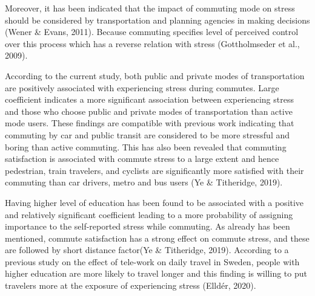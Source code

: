\documentclass[
11pt, %
oneside, %
english, %
singlespacing, %
]{macthesis} %
\begin{document}
Moreover, it has been indicated that the impact of commuting mode on stress should be considered by transportation and planning agencies in making decisions (Wener \& Evans, 2011). Because commuting specifies level of perceived control over this process which has a reverse relation with stress (Gottholmseder et al., 2009).

According to the current study, both public and private modes of transportation are positively associated with experiencing stress during commutes. Large coefficient indicates a more significant association between experiencing stress and those who choose public and private modes of transportation than active mode users. These findings are compatible with previous work indicating that commuting by car and public transit are considered to be more stressful and boring than active commuting. This has also been revealed that commuting satisfaction is associated with commute stress to a large extent and hence pedestrian, train travelers, and cyclists are significantly more satisfied with their commuting than car drivers, metro and bus users (Ye \& Titheridge, 2019).

Having higher level of education has been found to be associated with a positive and relatively significant coefficient leading to a more probability of assigning importance to the self-reported stress while commuting. As already has been mentioned, commute satisfaction has a strong effect on commute stress, and these are followed by short distance factor(Ye \& Titheridge, 2019). According to a previous study on the effect of tele-work on daily travel in Sweden, people with higher education are more likely to travel longer and this finding is willing to put travelers more at the exposure of experiencing stress (Elldér, 2020).
\end{document}
